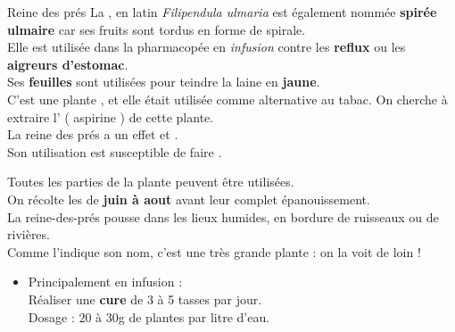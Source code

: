 \label{reinepres}
\ficheidentiteplante
{Reine des prés}
{%
    La , en latin \textit{Filipendula ulmaria} est également nommée
    \textbf{spirée ulmaire} car ses fruits sont tordus en forme de spirale.\\


    Elle est utilisée dans la pharmacopée en \textit{infusion} contre les \textbf{reflux} ou les \textbf{aigreurs d'estomac}.\\

    Ses \textbf{feuilles} sont utilisées pour teindre la laine en \textbf{jaune}.\\

    C'est une plante , et elle était utilisée comme alternative au tabac.
}
{%
    On cherche à extraire l' ( aspirine ) de cette plante. \\

    La reine des prés a un effet  et .\\

    Son utilisation est susceptible de faire .
}
{%

    Toutes les parties de la plante peuvent être utilisées.\\
    On récolte les  de \textbf{juin à aout} avant leur complet épanouissement. \\

    La reine-des-prés pousse dans les lieux humides, en bordure de ruisseaux ou de rivières.\\
    Comme l'indique son nom, c'est une très grande plante : on la voit de loin !
}
{%
    \begin{itemize}[label = \bcplume]
        \item Principalement en infusion :\\
                Réaliser une \textbf{cure} de 3 à 5 tasses par jour. \\
                Dosage : $20$ à $30$g de plantes par litre d'eau.
    \end{itemize}
}
